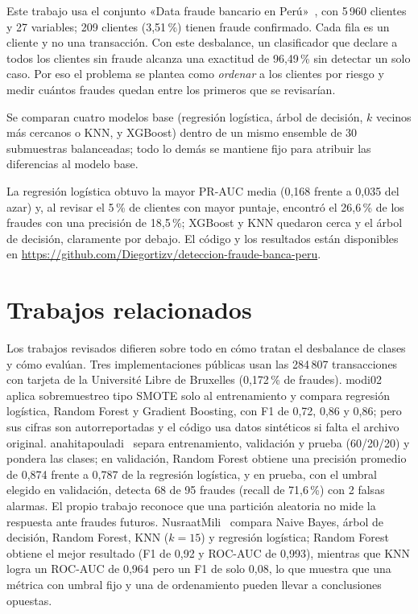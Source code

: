 \documentclass[conference,a4paper]{IEEEtran}
\begin{document}
Este trabajo usa el conjunto «Data fraude bancario en Perú»~\cite{kaggle}, con 5\,960 clientes
y 27 variables; 209 clientes (3,51\,\%) tienen fraude confirmado. Cada fila es un cliente y no
una transacción. Con este desbalance, un clasificador que declare a todos los clientes sin
fraude alcanza una exactitud de 96,49\,\% sin detectar un solo caso. Por eso el problema se
plantea como \emph{ordenar} a los clientes por riesgo y medir cuántos fraudes quedan entre los
primeros que se revisarían.

Se comparan cuatro modelos base (regresión logística, árbol de decisión, $k$ vecinos más
cercanos o KNN, y XGBoost) dentro de un mismo ensemble de 30 submuestras balanceadas; todo lo
demás se mantiene fijo para atribuir las diferencias al modelo base.

La regresión logística obtuvo la mayor PR-AUC media (0,168 frente a 0,035 del azar) y, al
revisar el 5\,\% de clientes con mayor puntaje, encontró el 26,6\,\% de los fraudes con una
precisión de 18,5\,\%; XGBoost y KNN quedaron cerca y el árbol de decisión, claramente por
debajo. El código y los resultados están disponibles en
\url{https://github.com/Diegortizv/deteccion-fraude-banca-peru}.

\section{Trabajos relacionados}

Los trabajos revisados difieren sobre todo en cómo tratan el desbalance de clases y cómo
evalúan. Tres implementaciones públicas usan las 284\,807 transacciones con tarjeta de la
Université Libre de Bruxelles (0,172\,\% de fraudes).
modi02~\cite{modi02} aplica sobremuestreo tipo SMOTE solo al entrenamiento y compara
regresión logística, Random Forest y Gradient Boosting, con F1 de 0,72, 0,86 y 0,86; pero sus
cifras son autorreportadas y el código usa datos sintéticos si falta el archivo original. anahitapouladi~\cite{anahitapouladi}
separa entrenamiento, validación y prueba (60/20/20) y pondera las clases; en validación,
Random Forest obtiene una precisión promedio de 0,874 frente a 0,787 de la regresión logística,
y en prueba, con el umbral elegido en validación, detecta 68 de 95 fraudes (recall de
71,6\,\%) con 2 falsas alarmas. El propio trabajo reconoce que una partición aleatoria no mide
la respuesta ante fraudes futuros. NusraatMili~\cite{nusraatmili} compara Naive Bayes, árbol
de decisión, Random Forest, KNN ($k=15$) y regresión logística; Random Forest obtiene el mejor
resultado (F1 de 0,92 y ROC-AUC de 0,993), mientras que KNN logra un ROC-AUC de 0,964 pero un
F1 de solo 0,08, lo que muestra que una métrica con umbral fijo y una de ordenamiento pueden
llevar a conclusiones opuestas.
\end{document}
